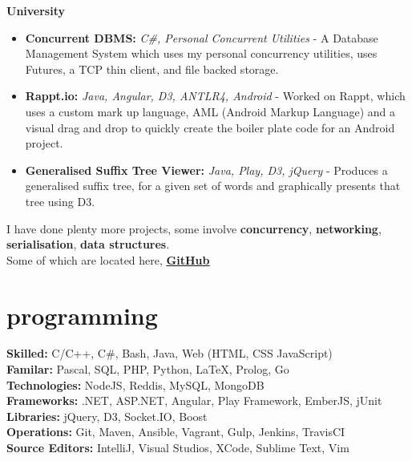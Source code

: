 \documentclass[]{friggeri-cv} %
\begin{document}
{
  \large\textbf{University}
}
\begin{itemize}
    \item \textbf{Concurrent DBMS:} \emph{C\#, Personal Concurrent Utilities} -
        A Database Management System which uses my personal concurrency utilities,
        uses Futures, a TCP thin client, and file backed storage.
    \item \textbf{Rappt.io:} \emph{Java, Angular, D3, ANTLR4, Android} -
        Worked on Rappt, which uses a custom mark up language, AML (Android Markup Language)
          and a visual drag and drop to quickly create the boiler plate code for an Android project.
    \item \textbf{Generalised Suffix Tree Viewer:} \emph{Java, Play, D3, jQuery} -
        Produces a generalised suffix tree, for a given set of words and graphically
          presents that tree using D3.
\end{itemize}

I have done plenty more projects, some involve \textbf{concurrency}, \textbf{networking}, \textbf{serialisation}, \textbf{data structures}. \\
Some of which are located here, \underline{\textbf{\href{http://github.com/Compulsed/}{GitHub}}} \\


\section{programming}
    \textbf{Skilled:} C/C++, C\#, Bash, Java, Web (HTML, CSS JavaScript) \\
    \textbf{Familar:} Pascal, SQL, PHP, Python, LaTeX, Prolog, Go \\
    \textbf{Technologies:} NodeJS, Reddis, MySQL, MongoDB \\
    \textbf{Frameworks:} .NET, ASP.NET, Angular, Play Framework, EmberJS, jUnit \\
    \textbf{Libraries:} jQuery, D3, Socket.IO, Boost \\
    \textbf{Operations:} Git, Maven, Ansible, Vagrant, Gulp, Jenkins, TravisCI \\
    \textbf{Source Editors:} IntelliJ, Visual Studios, XCode, Sublime Text, Vim \\
\end{document}
